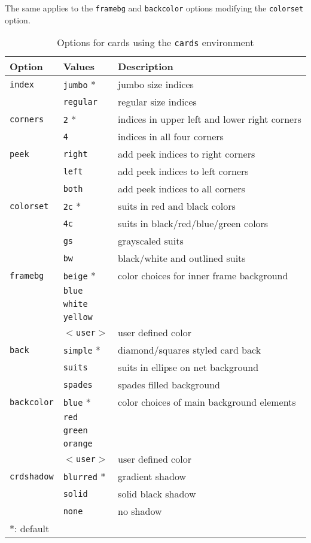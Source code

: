 \documentclass[11pt,english,BCOR10mm,DIV12,bibliography=totoc,parskip=false,smallheadings,
    headexclude,footexclude,oneside]{pst-doc}
\begin{document}
The same applies to the \texttt{framebg} and \texttt{backcolor} options modifying the \texttt{colorset} option.

\begin{table}[!htb]
\centering
\caption{Options for cards using the \texttt{cards} environment}\label{tab-opts}
\begin{tabular}{lll}
 Option & Values & Description \\\hline
\texttt{index} & \texttt{jumbo} *& jumbo size indices\\
& \texttt{regular} & regular size indices\\\hline
\texttt{corners} & \texttt{2} *& indices in upper left and lower right corners\\
& \texttt{4} & indices in all four corners\\\hline
\texttt{peek} & \texttt{right} & add peek indices to right corners\\
& \texttt{left} & add peek indices to left corners\\
& \texttt{both} & add peek indices to all corners\\\hline
\texttt{colorset} & \texttt{2c} * & suits in red and black colors\\
& \texttt{4c} & suits in black/red/blue/green colors\\
& \texttt{gs} & grayscaled suits\\
& \texttt{bw} & black/white and outlined suits\\\hline
\texttt{framebg} & \texttt{beige} *& color choices for inner frame background\\
& \texttt{blue} & \\
& \texttt{white} & \\
& \texttt{yellow} & \\
& $<$\texttt{user}$>$ & user defined color\\\hline
\texttt{back} & \texttt{simple} *& diamond/squares styled card back\\
& \texttt{suits} & suits in ellipse on net background\\
& \texttt{spades} & spades filled background\\\hline
\texttt{backcolor} & \texttt{blue} *& color choices of main background elements\\
& \texttt{red} & \\
& \texttt{green} & \\
& \texttt{orange} & \\
& $<$\texttt{user}$>$ & user defined color\\\hline
\texttt{crdshadow} & \texttt{blurred} *& gradient shadow\\
& \texttt{solid} & solid black shadow\\
& \texttt{none} & no shadow\\\hline
*: default\\
\end{tabular}
\end{table}
\end{document}
